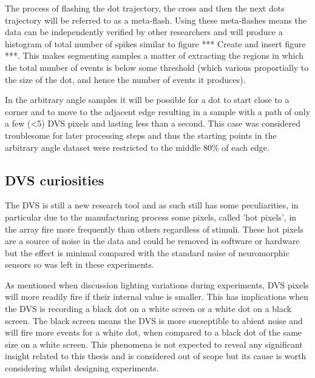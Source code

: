 The process of flashing the dot trajectory, the cross and then the next dots trajectory will be referred to as a meta-flash. 
Using these meta-flashes means the data can be independently verified by other researchers and will produce a histogram of total number of spikes similar to figure *** Create and insert figure ***.
This makes segmenting samples a matter of extracting the regions in which the total number of events is below some threshold (which various proportially to the size of the dot, and hence the number of events it produces). 


In the arbitrary angle samples it will be possible for a dot to start close to a corner and to move to the adjacent edge resulting in a sample with a path of only a few (\textless 5) DVS pixels and lasting less than a second.
This case was considered troublesome for later processing steps and thus the starting points in the arbitrary angle dataset were restricted to the middle 80\% of each edge. 

\subsection{DVS curiosities}

The DVS is still a new research tool and as such still has some peculiarities, in particular due to the manufacturing process some pixels, called 'hot pixels', in the array fire more frequently than others regardless of stimuli. 
These hot pixels are a source of noise in the data and could be removed in software or hardware but the effect is minimal compared with the standard noise of neuromorphic sensors so was left in these experiments. 

As mentioned when discussion lighting variations during experiments, DVS pixels will more readily fire if their internal value is smaller.
This has implications when the DVS is recording a black dot on a white screen or a white dot on a black screen.
The black screen means the DVS is more sucseptible to abient noise and will fire more events for a white dot, when compared to a black dot of the same size on a white screen. 
This phenomena is not expected to reveal any significant insight related to this thesis and is considered out of scope but its cause is worth considering whilst designing experiments. 



